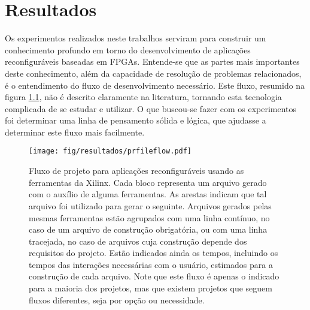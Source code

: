 \documentclass[11pt,a4paper,oneside]{book}
\begin{document}
	\frontmatter
	\tableofcontents
	\mainmatter 
	
	\newcommand\qt[1]{\lq\lq{}#1\rq\rq{}}
	\newcommand\qti[1]{\lq\lq{}\textit{#1}\rq\rq{}}
\fi
                      
\chapter{Resultados}\label{CapExperimentos}

\vspace{0.8cm}

Os experimentos realizados neste trabalhos serviram para construir um conhecimento profundo em torno do desenvolvimento de aplicações reconfiguráveis baseadas em FPGAs.
Entende-se que as partes mais importantes deste conhecimento, além da capacidade de resolução de problemas relacionados, é o entendimento do fluxo de desenvolvimento necessário.
Este fluxo, resumido na figura \ref{fig:res:prfileflow}, não é descrito claramente na literatura, tornando esta tecnologia complicada de se estudar e utilizar.
O que buscou-se fazer com os experimentos foi determinar uma linha de pensamento sólida e lógica, que ajudasse a determinar este fluxo mais facilmente.

\begin{figure}[htp]
\centering
\texttt{[image: fig/resultados/prfileflow.pdf]}
\caption{Fluxo de projeto para aplicações reconfiguráveis usando as ferramentas da Xilinx. Cada bloco representa um arquivo gerado com o auxílio de alguma ferramentas. As arestas indicam que tal arquivo foi utilizado para gerar o seguinte. Arquivos gerados pelas mesmas ferramentas estão agrupados com uma linha contínuo, no caso de um arquivo de construção obrigatória, ou com uma linha tracejada, no caso de arquivos cuja construção depende dos requisitos do projeto. Estão indicados ainda os tempos, incluindo os tempos das interações necessárias com o usuário, estimados para a construção de cada arquivo. Note que este fluxo é apenas o indicado para a maioria dos projetos, mas que existem projetos que seguem fluxos diferentes, seja por opção ou necessidade.}
\label{fig:res:prfileflow}
\end{figure}
\end{document}
